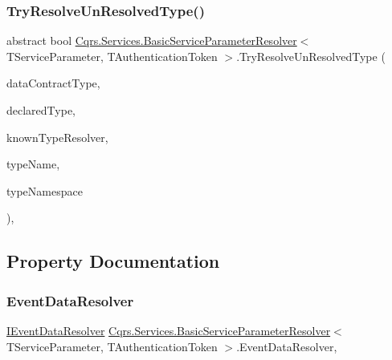 \subsubsection{\texorpdfstring{Try\+Resolve\+Un\+Resolved\+Type()}{TryResolveUnResolvedType()}}
{\footnotesize\ttfamily abstract bool \hyperlink{classCqrs_1_1Services_1_1BasicServiceParameterResolver}{Cqrs.\+Services.\+Basic\+Service\+Parameter\+Resolver}$<$ T\+Service\+Parameter, T\+Authentication\+Token $>$.Try\+Resolve\+Un\+Resolved\+Type (\begin{DoxyParamCaption}\item[{Type}]{data\+Contract\+Type,  }\item[{Type}]{declared\+Type,  }\item[{Data\+Contract\+Resolver}]{known\+Type\+Resolver,  }\item[{ref Xml\+Dictionary\+String}]{type\+Name,  }\item[{ref Xml\+Dictionary\+String}]{type\+Namespace }\end{DoxyParamCaption})\hspace{0.3cm}{\ttfamily [protected]}, {}}



\subsection{Property Documentation}
\mbox{\label{classCqrs_1_1Services_1_1BasicServiceParameterResolver_a49d548e272010a9047bac9671e5b1f70_a49d548e272010a9047bac9671e5b1f70}} 
\subsubsection{\texorpdfstring{Event\+Data\+Resolver}{EventDataResolver}}
{\footnotesize\ttfamily \hyperlink{interfaceCqrs_1_1Services_1_1IEventDataResolver}{I\+Event\+Data\+Resolver} \hyperlink{classCqrs_1_1Services_1_1BasicServiceParameterResolver}{Cqrs.\+Services.\+Basic\+Service\+Parameter\+Resolver}$<$ T\+Service\+Parameter, T\+Authentication\+Token $>$.Event\+Data\+Resolver\hspace{0.3cm}{\ttfamily [get]}, {\ttfamily [protected]}}

